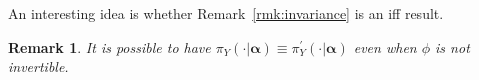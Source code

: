 \documentclass[a4paper, notitlepage, 10pt]{article}
\newtheorem{remark}{Remark}[]
\begin{document}
An interesting idea is whether Remark~\ref{rmk:invariance} is an iff result. 
\begin{remark}
 \label{rmk:invertibleIFF}
 It is possible to have  $\pi_Y( \cdot | \boldsymbol \alpha) \equiv \pi_Y^{\prime}( \cdot |  \boldsymbol \alpha)$ even when $\phi$ is not invertible.
\end{remark}
\end{document}
